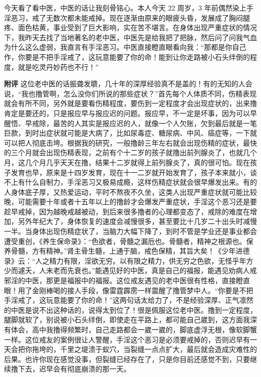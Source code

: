 \begin{case}
    今天看了看中医，中医的话让我刻骨铭心。本人今天 22 周岁，3 年前偶然染上手淫恶习，戒了无数次都未能戒掉。现在逐渐由原来的眼疲头昏，发展成了胸闷腿疼、面色枯黄，事业受到了巨大影响，实在苦不堪言。在身体出现严重症状的情况下，我昨天去找了当地著名的老中医，中医先是给我把了把脉，然后问了问我气血为什么这么虚弱，我直言有手淫恶习。中医直接瞪直眼看向我：“那都是你自己作，你要是不把手淫戒了，这玩意能要了你的命！能到让你走路被小石头绊倒的程度，就是吃灵丹妙药也不行！”

    \textbf{附评} 这位老中医的话振聋发聩，几十年的深厚经验真不是盖的！有的无知的人会说，“我也撸管啊，怎么没你们所说的那些症状？”首先每个人体质不同，伤精表现就会有所不同，另外就是要看伤精程度，要伤到一定程度才会出现症状的，出来撸肯定是要还的，只是报应早与报应迟的问题。报应早，不一定是坏事，因为可以早醒悟、早戒除，最苦的人其实是报应迟的人，就像一个人欠账，欠到最后就是一笔巨款，到时出症状就可能是大病了，比如尿毒症、糖尿病、中风、癌症等，一下就可以把人彻底击垮。根据我的研究，一般撸龄三年左右就会出现伤精的症状，最快的三个月就会出现伤精表现，之前有个十二岁的孩子就撸出前列腺炎了，也就几个月，这几个月几乎天天在撸，结果十二岁就得上前列腺炎了，真的很可怕。现在孩子发育也早，原来是十四岁发育，现在十一二岁就开始发育了，孩子本来就小，谈不上有什么自制力，手淫恶习又极易成瘾，这样伤精症状就会很早爆发出来。有的人身体底子厚，又热爱运动，平时不熬夜不久坐，这类人出现严重症状就可能比较晚，可能需要十年或者十五年以上的撸龄才会爆发严重症状，手淫这个恶习还是要趁早戒掉，因为越晚戒越被动，到后来很多撸者的心理都变态了，戒除的难度在增加，另外年纪大了，身体恢复的速度会减慢很多，甚至要比十几岁二十出头时减慢一半。当身体出现伤精症状了，当脑力大幅下降了，到时不管是学业还是事业都会遭受重创，《养生保命录》：“色欲者，骨髓之漏卮也。骨髓者，精神之根源也。保养骨髓，方有精神。”肾主骨生髓，上通于脑，戒色保精，其旨大矣！《少年进德录》云：“人之精力有限，淫欲无穷。以有限之精力，供无穷之色欲，无怪乎年方少而遽夭，人未老而先衰也。”能遇见好的中医，真是自己的福报，能遇见劝病人戒邪淫的中医，那更是福报中的福报。这位戒友遇见的老中医很有性格，直接瞪直眼！用了金刚棒喝的接人手段，像雷霆霹雳一样震醒了撸管梦中人。“你要是不把手淫戒了，这玩意能要了你的命！”这两句话太给力了，不是经验深厚、正气凛然的中医是说不出这种话的，说得太到位了！很是佩服这位老中医。撸到一定程度，腿脚就软了，别说被小石头绊倒，即使走在平路上，都可能自己崴到，这方面我深有体会，高中我撸得频繁时，自己走路都会一崴一崴的，脚底虚浮无根，像软脚蟹一样。这位戒友的案例很让人警醒，手淫这个恶习是必须要戒掉的，否则迟早有一天会把你拖垮的，千里之堤溃于蚁穴，当裂缝一点点扩大，最后就会造成灾难性的后果。也许你现在感觉没事，但裂缝已经存在了，只是你目前还感觉不到，只要继续撸下去，迟早会有彻底崩溃的那一天。
\end{case}

